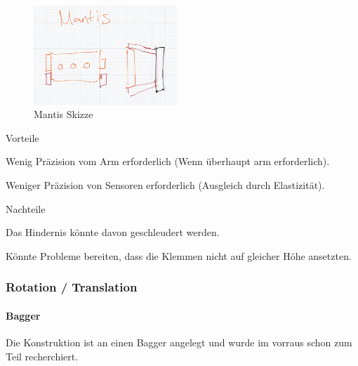 \documentclass[../main.tex]{subfiles}
\begin{document}
\begin{figure}[h!]
        \centering
        \includegraphics[width=0.48\textwidth]{img/technologierecherche/Aufnahme/Mantis.jpg}
        \caption{Mantis Skizze}
        \label{img:tech_Mantis}
\end{figure}

\begin{minipage}[t]{0.48\textwidth}
    \begin{items}
          \item [Vorteile]
          \item Wenig Präzision vom Arm erforderlich (Wenn überhaupt arm erforderlich).
          \item Weniger Präzision von Sensoren erforderlich (Ausgleich durch Elastizität).
    \end{items}
\end{minipage}
\hfill
\begin{minipage}[t]{0.48\textwidth}
    \begin{items}
          \item [Nachteile]
          \item Das Hindernis könnte davon geschleudert werden.
          \item Könnte Probleme bereiten, dass die Klemmen nicht auf gleicher Höhe ansetzten.
    \end{items}
\end{minipage}
\newpage
\subsubsection{Rotation / Translation}
\paragraph{Bagger}
Die Konstruktion ist an einen Bagger angelegt und wurde im vorraus schon zum Teil recherchiert.
\end{document}
